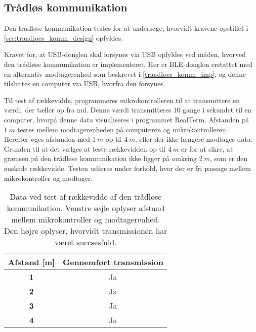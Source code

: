 \subsection{Trådløs kommunikation}
Den trådløse kommunikation testes for at undersøge, hvorvidt kravene opstillet i \autoref{sec:traadloes_komm_design} opfyldes. 

Kravet for, at USB-donglen skal forsynes via USB opfyldes ved måden, hvorved den trådløse kommunikation er implementeret. Her er BLE-donglen erstattet med en alternativ modtagerenhed som beskrevet i \autoref{traadloes_komm_imp}, og denne tilsluttes en computer via USB, hvorfra den forsynes. 

Til test af rækkevidde, programmeres mikrokontrolleren til at transmittere en værdi, der tæller op fra nul. Denne værdi transmitteres 10 gange i sekundet til en computer, hvorpå denne data visualiseres i programmet RealTerm.
Afstanden på $1~m$ testes mellem modtagerenheden på computeren og mikrokontrolleren. Herefter øges afstanden med $1~m$ op til $4~m$, eller der ikke længere modtages data. Grunden til at det vælges at teste rækkevidden op til $4~m$ er for at sikre, at grænsen på den trådløse kommunikation ikke ligger på omkring $2~m$, som er den ønskede rækkevidde. Testen udføres under forhold, hvor der er fri passage mellem mikrokontroller og modtager.  

\begin{table}[H]
\centering
\begin{tabular}{|c|c|}
\hline 
\textbf{Afstand [m]} & \textbf{Gennemført transmission} \\ 
\hline 
\textbf{1} & Ja \\ 
\hline 
\textbf{2} & Ja \\ 
\hline 
\textbf{3} & Ja \\ 
\hline 
\textbf{4} & Ja \\ 
\hline 
\end{tabular} 
\caption{Data ved test af rækkevidde af den trådløse kommunikation. Venstre søjle oplyser afstand mellem mikrokontroller og modtagerenhed. Den højre oplyser, hvorvidt transmissionen har været succsesfuld.}
\label{tab:traadloes_komm_test_afstand}
\end{table}

